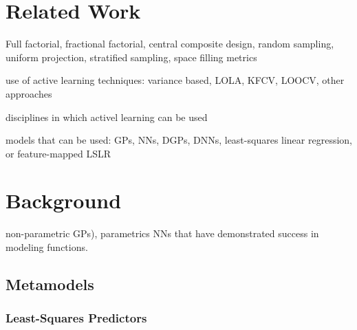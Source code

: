 \documentclass[conference]{IEEEtran}
\begin{document}
	
	
	
	
	\section{Related Work}
	\label{sec:related-work}
	
	Full factorial, fractional factorial, central composite design, random sampling, uniform projection, stratified sampling, space filling metrics
	
	use of active learning techniques: variance based, LOLA, KFCV, LOOCV, other approaches
	
	disciplines in which activel learning can be used
	
	models that can be used: GPs, NNs, DGPs, DNNs, least-squares linear regression, or feature-mapped LSLR
	
	\section{Background}
	\label{sec:background}
	
    non-parametric GPs), parametrics NNs that have demonstrated success in modeling functions.
    
    \subsection{Metamodels}
    
    \subsubsection{Least-Squares Predictors}
    
\end{document}
